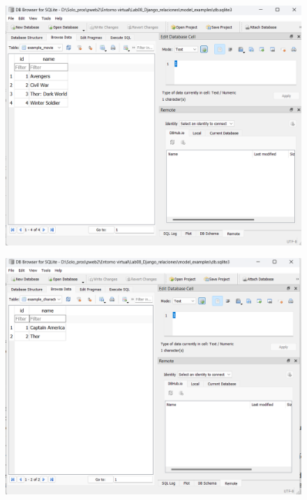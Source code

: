 \documentclass{article}
\begin{document}
	\begin{figure}[H]
		\centering
		\includegraphics[width=1.0\textwidth,keepaspectratio]{img/C3.png}
	\end{figure}
	\begin{figure}[H]
		\centering
		\includegraphics[width=1.0\textwidth,keepaspectratio]{img/C4.png}
	\end{figure}
\end{document}
